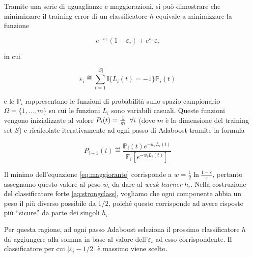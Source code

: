 Tramite una serie di uguaglianze e maggiorazioni, si pu\`o dimostrare che minimizzare il training error di un classificatore $h$ equivale a minimizzare la funzione

\begin{equation} \label{eq:maggiorante}
e^{-w_i}(1 - \varepsilon_i) + e^{w_i}\varepsilon_i 
\end{equation}

in cui

\[ \varepsilon_i \eqdef \sum\limits_{t=1}^{|S|}{\mathbb{I}\{L_i(t) = -1\}\mathbb{P}_i(t) } \]

e le $\mathbb{P}_i$ rappresentano le funzioni di probabilit\`a sullo spazio campionario \(\Omega = \{1, \dotsc, m\}\) su cui le funzioni $L_i$ sono variabili casuali. Queste funzioni vengono inizializzate al valore \(P_i(t) = \frac{1}{m} \hskip 0.5em \forall i \) (dove $m$ \`e la dimensione del training set $S$) e ricalcolate iterativamente ad ogni passo di Adaboost tramite la formula

\[ P_{i+1}(t) \eqdef \frac{\mathbb{P}_i(t)e^{-w_iL_i(t)}}{\mathbb{E}_i[e^{-w_iL_i(t)}]} \]

Il minimo dell'equazione \ref{eq:maggiorante} corrisponde a \(w = \frac{1}{2} \ln{\frac{1 - \varepsilon}{\varepsilon}}\), pertanto assegnamo questo valore al peso $w_i$ da dare al {\it weak learner} $h_i$.
Nella costruzione del classificatore forte \ref{eq:strongclass}, vogliamo che ogni componente abbia un peso il pi\`u  diverso possibile da $1/2$, poich\'e questo corrisponde ad avere risposte pi\`u ``sicure'' da parte dei singoli $h_i$.

Per questa ragione, ad ogni passo Adaboost seleziona il prossimo classificatore $h$ da aggiungere alla somma in base al valore dell'$\varepsilon_i$ ad esso corrispondente. Il classificatore per cui \(|\varepsilon_i - 1/2|\) \`e massimo viene scelto.